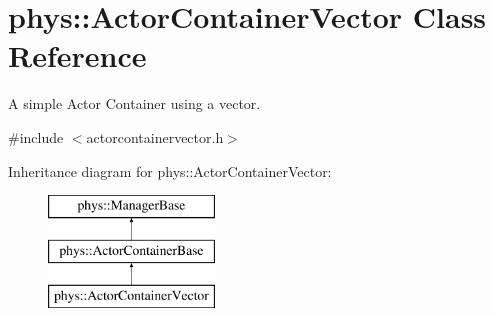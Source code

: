 \hypertarget{classphys_1_1ActorContainerVector}{
\section{phys::ActorContainerVector Class Reference}
\label{d3/d64/classphys_1_1ActorContainerVector}
}


A simple Actor Container using a vector.  




{\ttfamily \#include $<$actorcontainervector.h$>$}

Inheritance diagram for phys::ActorContainerVector:\begin{figure}[H]
\begin{center}
\leavevmode
\includegraphics[height=3.000000cm]{d3/d64/classphys_1_1ActorContainerVector}
\end{center}
\end{figure}
